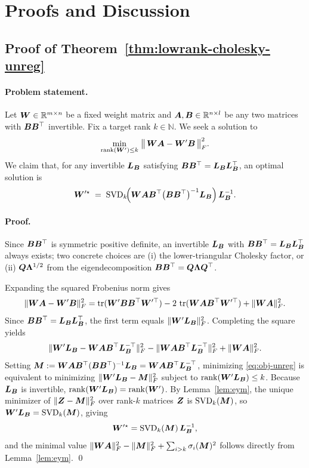 \documentclass[10pt]{article} %
\theoremstyle{definition}
\theoremstyle{remark}
\begin{document}



\newpage
\appendix
\section{Proofs and Discussion}
\label{sec:proof-lowrank}

\subsection{Proof of Theorem~\ref{thm:lowrank-cholesky-unreg}}

\paragraph{Problem statement.}
Let ${\bm{W}}\in\mathbb{R}^{m\times n}$ be a fixed weight matrix and ${\bm{A}},{\bm{B}}\in\mathbb{R}^{n\times l}$ be any two matrices with ${\bm{B}}{\bm{B}}^\top$ invertible.
Fix a target rank $k\in\mathbb{N}$.
We seek a solution to
\[
\min_{\operatorname{rank}({\bm{W}}')\le k}\;\bigl\|\,{\bm{W}}{\bm{A}} - {\bm{W}}'{\bm{B}}\,\bigr\|_F^2.
\]
We claim that, for any invertible ${\bm{L}}_{\bm{B}}$ satisfying ${\bm{B}}{\bm{B}}^\top = {\bm{L}}_{\bm{B}}{\bm{L}}_{\bm{B}}^\top$, an optimal solution is
\[
{\bm{W}}'^{\star} \;=\; \operatorname{SVD}_k\!\Bigl({\bm{W}}{\bm{A}}{\bm{B}}^{\top}\bigl({\bm{B}}{\bm{B}}^{\top}\bigr)^{-1}{\bm{L}}_{\bm{B}}\Bigr)\,{\bm{L}}_{\bm{B}}^{-1}.
\]

\paragraph{Proof.}
Since ${\bm{B}}{\bm{B}}^\top$ is symmetric positive definite, an invertible ${\bm{L}}_{\bm{B}}$ with ${\bm{B}}{\bm{B}}^\top = {\bm{L}}_{\bm{B}}{\bm{L}}_{\bm{B}}^\top$ always exists; two concrete choices are (i) the lower-triangular Cholesky factor, or (ii) ${\bm{Q}}{\bm{\Lambda}}^{1/2}$ from the eigendecomposition ${\bm{B}}{\bm{B}}^\top = {\bm{Q}}{\bm{\Lambda}}{\bm{Q}}^\top$.

Expanding the squared Frobenius norm gives
\[
\|{\bm{W}}{\bm{A}} - {\bm{W}}'{\bm{B}}\|_F^2
= \operatorname{tr}({\bm{W}}'{\bm{B}}{\bm{B}}^{\top}{\bm{W}}'^{\top}) - 2\,\operatorname{tr}({\bm{W}}{\bm{A}}{\bm{B}}^{\top}{\bm{W}}'^{\top}) + \|{\bm{W}}{\bm{A}}\|_F^2.
\]
Since ${\bm{B}}{\bm{B}}^\top = {\bm{L}}_{\bm{B}}{\bm{L}}_{\bm{B}}^\top$, the first term equals $\|{\bm{W}}'{\bm{L}}_{\bm{B}}\|_F^2$. Completing the square yields
\[
\|{\bm{W}}'{\bm{L}}_{\bm{B}} - {\bm{W}}{\bm{A}}{\bm{B}}^{\top}{\bm{L}}_{\bm{B}}^{-\top}\|_F^2 - \|{\bm{W}}{\bm{A}}{\bm{B}}^{\top}{\bm{L}}_{\bm{B}}^{-\top}\|_F^2 + \|{\bm{W}}{\bm{A}}\|_F^2.
\]
Setting ${\bm{M}} := {\bm{W}}{\bm{A}}{\bm{B}}^\top({\bm{B}}{\bm{B}}^\top)^{-1}{\bm{L}}_{\bm{B}} = {\bm{W}}{\bm{A}}{\bm{B}}^\top{\bm{L}}_{\bm{B}}^{-\top}$, minimizing \eqref{eq:obj-unreg} is equivalent to minimizing $\|{\bm{W}}'{\bm{L}}_{\bm{B}} - {\bm{M}}\|_F^2$ subject to $\operatorname{rank}({\bm{W}}'{\bm{L}}_{\bm{B}})\le k$.
Because ${\bm{L}}_{\bm{B}}$ is invertible, $\operatorname{rank}({\bm{W}}'{\bm{L}}_{\bm{B}})=\operatorname{rank}({\bm{W}}')$.
By Lemma~\ref{lem:eym}, the unique minimizer of $\|{\bm{Z}} - {\bm{M}}\|_F^2$ over rank-$k$ matrices ${\bm{Z}}$ is $\operatorname{SVD}_k({\bm{M}})$, so ${\bm{W}}'{\bm{L}}_{\bm{B}} = \operatorname{SVD}_k({\bm{M}})$, giving
\[
{\bm{W}}'^{\star} = \operatorname{SVD}_k({\bm{M}})\,{\bm{L}}_{\bm{B}}^{-1},
\]
and the minimal value $\|{\bm{W}}{\bm{A}}\|_F^2 - \|{\bm{M}}\|_F^2 + \sum_{i>k}\sigma_i({\bm{M}})^2$ follows directly from Lemma~\ref{lem:eym}. \qed
\\
\end{document}
